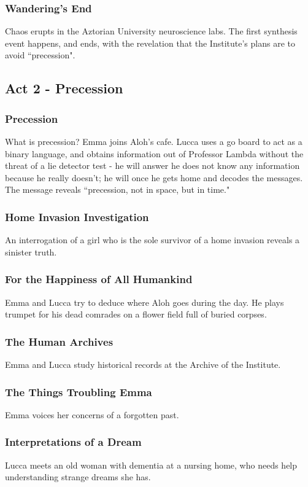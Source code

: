 \documentclass[11pt]{article}
\begin{document}
		\subsubsection{Wandering's End}
		Chaos erupts in the Aztorian University neuroscience labs. 
		The first synthesis event happens, and ends, with the revelation that the Institute's plans are to avoid ``precession".




	\subsection{Act 2 - Precession}
		\subsubsection{Precession}
		What is precession? 
		Emma joins Aloh's cafe.
		Lucca uses a go board to act as a binary language, and obtains information out of Professor Lambda without the threat of a lie detector test - he will answer he does not know any information because he really doesn't; he will once he gets home and decodes the messages.
		The message reveals ``precession, not in space, but in time."
		\subsubsection{Home Invasion Investigation}
		An interrogation of a girl who is the sole survivor of a home invasion reveals a sinister truth.
		\subsubsection{For the Happiness of All Humankind}
		Emma and Lucca try to deduce where Aloh goes during the day.
		He plays trumpet for his dead comrades on a flower field full of buried corpses.
		\subsubsection{The Human Archives}
		Emma and Lucca study historical records at the Archive of the Institute.
		\subsubsection{The Things Troubling Emma}
		Emma voices her concerns of a forgotten past.
		\subsubsection{Interpretations of a Dream}
		Lucca meets an old woman with dementia at a nursing home, who needs help understanding strange dreams she has. 
\end{document}
